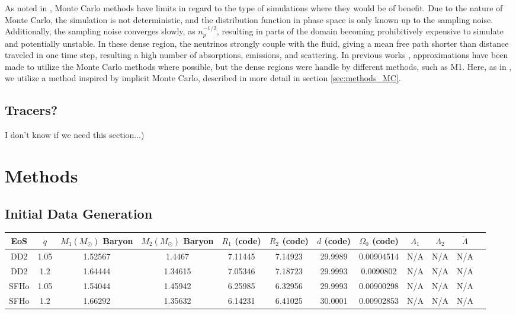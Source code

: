 \documentclass[%
twocolumn,
superscriptaddress,
nofootinbib,
 amsmath,amssymb,
 aps, prd
]{revtex4-2}
\newcommand{\alex}[1]{\color{red}{#1}}
\begin{document}
        As noted in \cite{Foucart_2021}, Monte Carlo methods have limits in regard to the type of simulations where they would be of benefit.
        Due to the nature of Monte Carlo, the simulation is not deterministic, and the distribution function in phase space is only known up to the sampling noise.
        Additionally, the sampling noise converges slowly, as $n_p^{-1/2}$, resulting in parts of the domain becoming prohibitively expensive to simulate and potentially unstable.
        In these dense region, the neutrinos strongly couple with the fluid, giving a mean free path shorter than distance traveled in one time step, resulting a high number of absorptions, emissions, and scattering.
        In previous works \cite{Foucart_2020,Foucart_201806,Foucart_201801}, approximations have been made to utilize the Monte Carlo methods where possible, but the dense regions were handle by different methods, such as M1.
        Here, as in \cite{Foucart_2023}, we utilize a method inspired by implicit Monte Carlo, described in more detail in section \ref{sec:methods_MC}.


  \subsection{Tracers?}
    {\alex (I don't know if we need this section...)}

\section{Methods}
  \subsection{Initial Data Generation}
\begin{table*}[t]
  \centering
  \begin{tabular}{||c||c|c||c|c|c|c|c|c|c|c|c||}
    \hline
    EoS & $q$ & $M_1 (M_\odot)$ Baryon & $M_2 (M_\odot)$ Baryon& $R_1$ (code) & $R_2$ (code) & $d$ (code) & $\Omega_0$ (code) & $\Lambda_1$ & $\Lambda_2$ & $\tilde{\Lambda}$\\
    \hline \hline
    DD2 & 1.05 & 1.52567 & 1.4467 & 7.11445 & 7.14923 & 29.9989 & 0.00904514 & N/A & N/A & N/A\\
    \hline
    DD2 & 1.2 & 1.64444& 1.34615 & 7.05346 & 7.18723 & 29.9993 & 0.0090802 & N/A & N/A & N/A\\
    \hline
    \hline
    SFHo & 1.05 & 1.54044 & 1.45942 & 6.25985 & 6.32956 & 29.9993  & 0.00900298 & N/A & N/A & N/A\\
    \hline
    SFHo & 1.2 & 1.66292 & 1.35632 & 6.14231 & 6.41025 & 30.0001 & 0.00902853 & N/A & N/A & N/A \\
    \hline
  \end{tabular}

  \caption{
    {\alex Numbers are still in code units (baryonic mass too), but I will shift them over soon. I just wanted them all in once place before I did all the calculations. And I need to do the $\Lambda$ calculations.}
}
  \label{tab:bns_parameters}
\end{table*}
\end{document}
